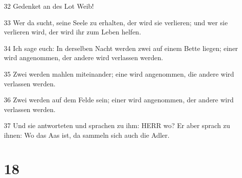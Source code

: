 \par 32 Gedenket an des Lot Weib!
\par 33 Wer da sucht, seine Seele zu erhalten, der wird sie verlieren; und wer sie verlieren wird, der wird ihr zum Leben helfen.
\par 34 Ich sage euch: In derselben Nacht werden zwei auf einem Bette liegen; einer wird angenommen, der andere wird verlassen werden.
\par 35 Zwei werden mahlen miteinander; eine wird angenommen, die andere wird verlassen werden.
\par 36 Zwei werden auf dem Felde sein; einer wird angenommen, der andere wird verlassen werden.
\par 37 Und sie antworteten und sprachen zu ihm: HERR wo? Er aber sprach zu ihnen: Wo das Aas ist, da sammeln sich auch die Adler.

\chapter{18}

